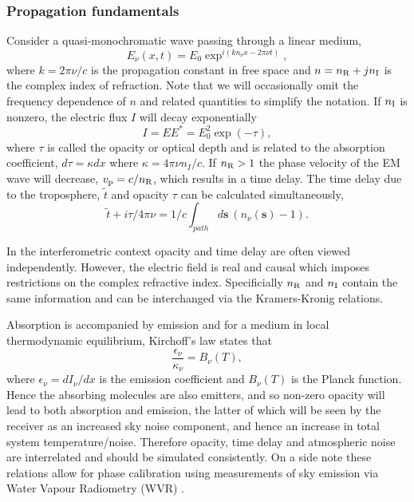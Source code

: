 \subsubsection{Propagation fundamentals}\label{sec:prop_fund}
Consider a quasi-monochromatic wave passing through a linear medium,
\begin{equation}
E_\nu(x,t) = E_0 \exp^{i(kn_\nu x - 2\pi\nu t)},
\end{equation}		
where $k=2\pi \nu/c$ is the propagation constant in free space and $n= n_{\rm R} + j n_{\rm I}$ is the complex index of refraction. Note that we will occasionally omit the frequency dependence of $n$ and related quantities to simplify the notation. If $n_{\rm I}$ is nonzero, the electric flux $I$ will decay exponentially
\begin{equation}
I = EE^\ast = E_0^2 \exp(-\tau),
\end{equation}
where $\tau$ is called the opacity or optical depth and is related to the absorption coefficient, $d\tau = \kappa dx$ where $\kappa = 4\pi \nu n_I/c$. If $n_{\rm R} > 1 $ the phase velocity of the EM wave will decrease, $v_{\rm p} = c/n_{\rm R}$, which results in a time delay. The time delay due to the troposphere, $\tilde{t}$ and opacity $\tau$ can be calculated simultaneously,
\begin{equation}\label{timedelay}
\tilde{t} + i \tau /4\pi \nu =1/c \int_{path} d\bm{s}\  (n_\nu(\bm{s}) -1).
\end{equation}

In the interferometric context opacity and time delay are often viewed independently. However, the electric field is real and causal which imposes restrictions on the complex refractive index. Specificially $n_{\rm R}$ and $n_{\rm I}$ contain the same information and can be interchanged via the Kramers-Kronig relations. 

Absorption is accompanied by emission and for a medium in local thermodynamic equilibrium, Kirchoff's law states that 
\begin{equation}\label{kirchoff}
\frac{\epsilon_\nu}{\kappa_\nu}=B_\nu(T),
\end{equation}
where $\epsilon_\nu = dI_\nu/dx$ is the emission coefficient and $B_\nu(T)$ is the Planck function. Hence the absorbing molecules are also emitters, and so non-zero opacity will lead to both absorption and emission, the latter of which will be seen by the receiver as an increased sky noise component, and hence an increase in total system temperature/noise. Therefore opacity, time delay and atmospheric noise are interrelated and should be simulated consistently. On a side note these relations allow for phase calibration using measurements of sky emission via Water Vapour Radiometry (WVR) \citep*[e.g.][]{Carilli_1999}.

